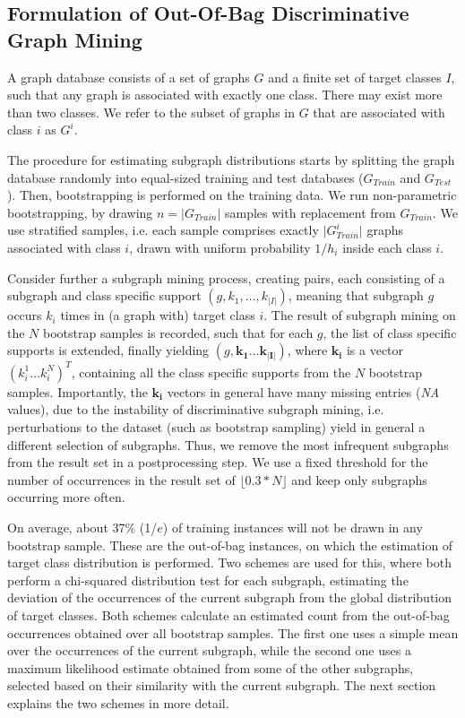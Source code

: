 \documentclass{article}
\begin{document}
\subsection{Formulation of Out-Of-Bag Discriminative Graph Mining}

A graph database consists of a set of graphs $G$ and a finite set of target
classes $I$, such that any graph is associated with exactly one class. There
may exist more than two classes. We refer to the subset of graphs in $G$ that
are associated with class $i$ as $G^i$.

The procedure for estimating subgraph distributions starts by splitting the graph
database randomly into equal-sized training and test databases ($G_{Train}$ and
$G_{Test}$). Then, bootstrapping is performed on the training data. We run
non-parametric bootstrapping, by drawing $n=\vert G_{Train}\vert$ samples with
replacement from  $G_{Train}$. We use stratified samples, i.e. each sample
comprises exactly $\vert G_{Train}^i\vert$ graphs associated with class $i$, drawn with
uniform probability $1/h_i$ inside each class $i$.

Consider further a subgraph mining process, creating pairs, each consisting of
a subgraph and class specific support $(g,k_1,\ldots,k_{\vert I\vert})$,
meaning that subgraph $g$ occurs $k_i$ times in (a graph with) target class
$i$.  The result of subgraph mining on the $N$ bootstrap samples is recorded,
such that for each $g$, the list of class specific supports is extended, finally
yielding $(g,\mathbf{k_1}\ldots\mathbf{k_{\vert I\vert}})$, where $\mathbf{k_i}$
is a vector $(k_i^1\ldots k_i^N)^T$, containing all the class specific supports
from the $N$ bootstrap samples.
Importantly, the $\mathbf{k_i}$ vectors in general have many missing entries
(\emph{NA} values), due to the instability of discriminative subgraph mining, i.e.
perturbations to the dataset (such as bootstrap sampling) yield in general a
different selection of subgraphs. Thus, we remove the most infrequent subgraphs
from the result set in a postprocessing step. We use a fixed threshold for the number of occurrences in the result set of $\lfloor0.3*N\rfloor$ and keep only subgraphs occurring more often.

On average, about 37\% (1/$e$) of training instances will not be drawn in any
bootstrap sample. These are the out-of-bag instances, on which the estimation
of target class distribution is performed. Two schemes are used for this, where both
perform a chi-squared distribution test for each subgraph, estimating the
deviation of the occurrences of the current subgraph from the global
distribution of target classes. Both schemes calculate an estimated count from
the out-of-bag occurrences obtained over all bootstrap samples. The first one
uses a simple mean over the occurrences of the current subgraph, while the
second one uses a maximum likelihood estimate obtained from some of the other
subgraphs, selected based on their similarity with the current subgraph. The next
section explains the two schemes in more detail.
\end{document}
